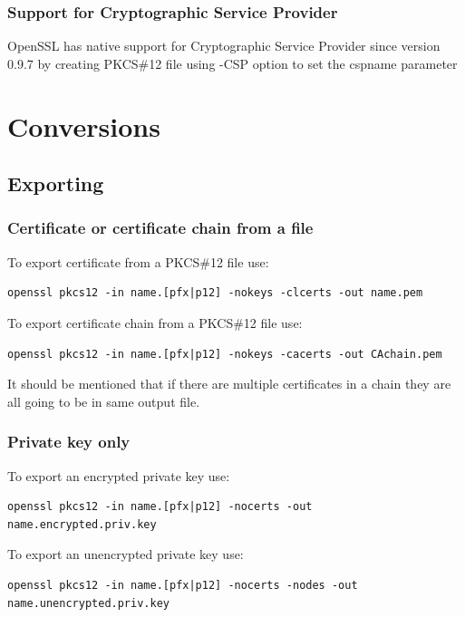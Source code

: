 \documentclass[10pt, a4paper]{report}
\begin{document}
    \subsubsection{Support for Cryptographic Service Provider}
OpenSSL has native support for Cryptographic Service Provider since version 0.9.7 by creating PKCS\#12 file using -CSP option to set the cspname parameter

    
\section{Conversions}

  \subsection{Exporting}
  
    \subsubsection{Certificate or certificate chain from a file}
    To export certificate from a PKCS\#12 file use:
\begin{verbatim}
openssl pkcs12 -in name.[pfx|p12] -nokeys -clcerts -out name.pem
\end{verbatim}

    To export certificate chain from a PKCS\#12 file use:
\begin{verbatim}
openssl pkcs12 -in name.[pfx|p12] -nokeys -cacerts -out CAchain.pem
\end{verbatim}
    It should be mentioned that if there are multiple certificates in a chain they are all going to be in same output file.

    \subsubsection{Private key only}
    To export an encrypted private key use:
\begin{verbatim}
openssl pkcs12 -in name.[pfx|p12] -nocerts -out name.encrypted.priv.key
\end{verbatim}

    To export an unencrypted private key use:
\begin{verbatim}
openssl pkcs12 -in name.[pfx|p12] -nocerts -nodes -out name.unencrypted.priv.key
\end{verbatim}
\end{document}
